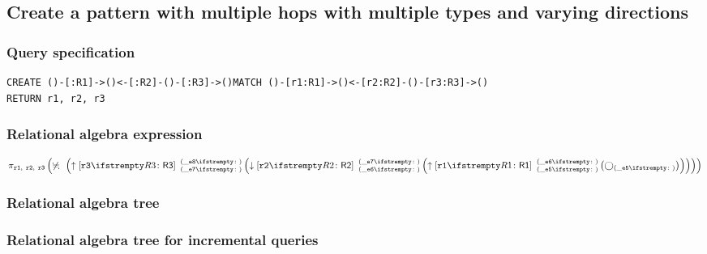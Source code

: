 \subsection{Create a pattern with multiple hops with multiple types and varying directions}

\subsubsection*{Query specification}

\begin{lstlisting}
CREATE ()-[:R1]->()<-[:R2]-()-[:R3]->()MATCH ()-[r1:R1]->()<-[r2:R2]-()-[r3:R3]->()
RETURN r1, r2, r3
\end{lstlisting}

\subsubsection*{Relational algebra expression}

$\projection{\var{r1},~\var{r2},~\var{r3}} \left(\alldifferent{} \left(\expandout{r3}{R3}{\_e7}{\_e8}{} \left(\expandin{r2}{R2}{\_e6}{\_e7}{} \left(\expandout{r1}{R1}{\_e5}{\_e6}{} \left(\getvertices{\_e5}{}\right)\right)\right)\right)\right)$

\subsubsection*{Relational algebra tree}


\subsubsection*{Relational algebra tree for incremental queries}

